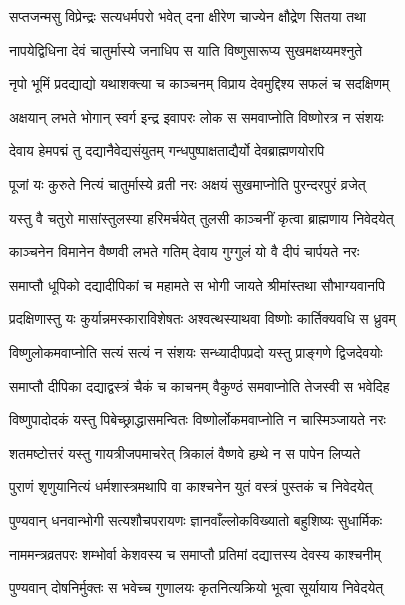 \twolineshloka
{सप्तजन्मसु विप्रेन्द्रः सत्यधर्मपरो भवेत्}
{दना क्षीरेण चाज्येन क्षौद्रेण सितया तथा} %

\twolineshloka
{नापयेद्विधिना देवं चातुर्मास्ये जनाधिप}
{स याति विष्णुसारूप्य सुखमक्षय्यमश्नुते} %

\twolineshloka
{नृपो भूमिं प्रदद्याद्यो यथाशक्त्या च काञ्चनम्}
{विप्राय देवमुद्दिश्य सफलं च सदक्षिणम्} %

\twolineshloka
{अक्षयान् लभते भोगान् स्वर्ग इन्द्र इवापरः}
{लोक स समवाप्नोति विष्णोरत्र न संशयः} %

\twolineshloka
{देवाय हेमपद्मं तु दद्यानैवेद्यसंयुतम्}
{गन्धपुष्पाक्षताद्यैर्यो देवब्राह्मणयोरपि} %

\twolineshloka
{पूजां यः कुरुते नित्यं चातुर्मास्ये व्रती नरः}
{अक्षयं सुखमाप्नोति पुरन्दरपुरं व्रजेत्} %

\twolineshloka
{यस्तु वै चतुरो मासांस्तुलस्या हरिमर्चयेत्}
{तुलसी काञ्चनीं कृत्वा ब्राह्मणाय निवेदयेत्} %

\twolineshloka
{काञ्चनेन विमानेन वैष्णवी लभते गतिम्}
{देवाय गुग्गुलं यो वै दीपं चार्पयते नरः} %

\twolineshloka
{समाप्तौ धूपिको दद्यादीपिकां च महामते}
{स भोगी जायते श्रीमांस्तथा सौभाग्यवानपि} %

\twolineshloka
{प्रदक्षिणास्तु यः कुर्यान्नमस्काराविशेषतः}
{अश्वत्थस्याथवा विष्णोः कार्तिक्यवधि स ध्रुवम्} %

\twolineshloka
{विष्णुलोकमवाप्नोति सत्यं सत्यं न संशयः}
{सन्ध्यादीपप्रदो यस्तु प्राङ्गणे द्विजदेवयोः} %

\twolineshloka
{समाप्तौ दीपिका दद्याद्वस्त्रं चैकं च काचनम्}
{वैकुण्ठं समवाप्नोति तेजस्वी स भवेदिह} %

\twolineshloka
{विष्णुपादोदकं यस्तु पिबेच्छ्राद्धासमन्वितः}
{विष्णोर्लोकमवाप्नोति न चास्मिञ्जायते नरः} %

\twolineshloka
{शतमष्टोत्तरं यस्तु गायत्रीजपमाचरेत्}
{त्रिकालं वैष्णवे हम्र्थे न स पापेन लिप्यते} %

\twolineshloka
{पुराणं शृणुयानित्यं धर्मशास्त्रमथापि वा}
{काश्चनेन युतं वस्त्रं पुस्तकं च निवेदयेत्} %

\twolineshloka
{पुण्यवान् धनवान्भोगी सत्यशौचपरायणः}
{ज्ञानवाँल्लोकविख्यातो बहुशिष्यः सुधार्मिकः} %

\twolineshloka
{नाममन्त्रव्रतपरः शम्भोर्वा केशवस्य च}
{समाप्तौ प्रतिमां दद्यात्तस्य देवस्य काश्चनीम्} %

\twolineshloka
{पुण्यवान् दोषनिर्मुक्तः स भवेच्च गुणालयः}
{कृतनित्यक्रियो भूत्वा सूर्यायाय निवेदयेत्} %

